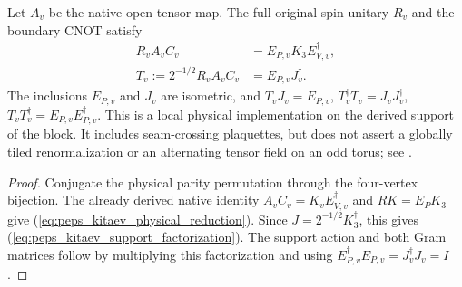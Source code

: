 \begin{lemma}
    \label{thm:peps_kitaev_native_physical_support}
    \leanok
    Let $A_v$ be the native open tensor map. The full original-spin unitary
    $R_v$ and the boundary CNOT satisfy
    \begin{align}
        R_vA_vC_v              & =E_{P,v}K_3E_{V,v}^\dagger,\label{eq:peps_kitaev_physical_reduction} \\
        T_v:=2^{-1/2}R_vA_vC_v & =E_{P,v}J_v^\dagger.
        \label{eq:peps_kitaev_support_factorization}
    \end{align}
    The inclusions $E_{P,v}$ and $J_v$ are isometric, and
    $T_vJ_v=E_{P,v}$,
    $T_v^\dagger T_v=J_vJ_v^\dagger$,
    $T_vT_v^\dagger=E_{P,v}E_{P,v}^\dagger$.
    This is a local physical implementation on the derived support of the
    block. It includes seam-crossing plaquettes, but does not assert a globally
    tiled renormalization or an alternating tensor field on an odd torus; see
    \cite{gap:rmp_peps_quantum_double_g_isometry}.
\end{lemma}
\begin{proof}
    \leanok
    Conjugate the physical parity permutation through the four-vertex
    bijection. The already derived native identity $A_vC_v=K_vE_{V,v}^\dagger$
    and $RK=E_PK_3$ give (\ref{eq:peps_kitaev_physical_reduction}).
    Since $J=2^{-1/2}K_3^\dagger$, this gives
    (\ref{eq:peps_kitaev_support_factorization}). The support action and both
    Gram matrices follow by multiplying this factorization and using
    $E_{P,v}^\dagger E_{P,v}=J_v^\dagger J_v=I$.
\end{proof}
